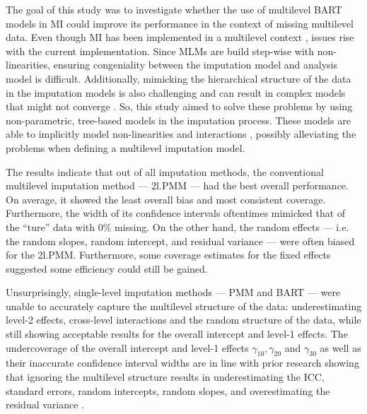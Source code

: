 \documentclass[3p,12pt,a4paper]{elsarticle}
\begin{document}
The goal of this study was to investigate whether the use of multilevel BART models in MI could improve its performance in the context of missing multilevel data. Even though MI has been implemented in a multilevel context \citep{mistlerComparisonJointModel2017, enders2018, enders2018a, enders2020, buurenFlexibleImputationMissing2018, taljaard2008, enders2016, resche-rigon2018, audigier2018, dong2023, grund2016, grund2018a, grund2018, ludtke2017, grund2021, quartagno2022}, issues rise with the current implementation. Since MLMs are build step-wise with non-linearities, ensuring congeniality between the imputation model and analysis model is difficult. Additionally, mimicking the hierarchical structure of the data in the imputation models is also challenging \citep{buurenFlexibleImputationMissing2018, burgette2010, hox2011} and can result in complex models that might not converge \citep{buurenFlexibleImputationMissing2018}. So, this study aimed to solve these problems by using non-parametric, tree-based models in the imputation process. These models are able to implicitly model non-linearities and interactions \citep{hill2020, burgette2010, lin2019, chipman2010, james2021, salditt2023, breiman1984}, possibly alleviating the problems when defining a multilevel imputation model. 

The results indicate that out of all imputation methods, the conventional multilevel imputation method --- 2l.PMM --- had the best overall performance. On average, it showed the least overall bias and most consistent coverage. Furthermore, the width of its confidence intervals oftentimes mimicked that of the ``ture'' data with 0\% missing. On the other hand, the random effects --- i.e. the random slopes, random intercept, and residual variance --- were often biased for the 2l.PMM. Furthermore, some coverage estimates for the fixed effects suggested some efficiency could still be gained. %

Unsurprisingly, single-level imputation methods --- PMM and BART --- were unable to accurately capture the multilevel structure of the data: underestimating level-2 effects, cross-level interactions and the random structure of the data, while still showing acceptable results for the overall intercept and level-1 effects. The undercoverage of the overall intercept and level-1 effects $\gamma_{10}, \gamma_{20}$ and $\gamma_{30}$ as well as their inaccurate confidence interval widths are in line with prior research showing that ignoring the multilevel structure results in underestimating the ICC, standard errors, random intercepts, random slopes, and overestimating the residual variance \citep{buurenFlexibleImputationMissing2018, ludtke2017, taljaard2008, hox2011,enders2016}.
\end{document}
